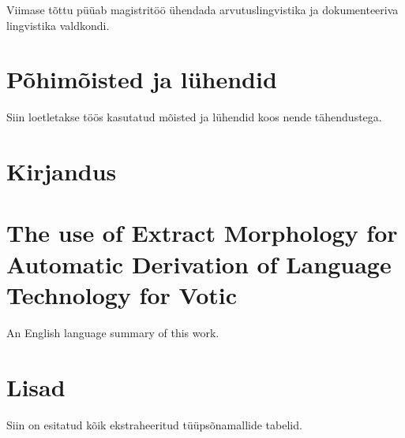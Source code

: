 \documentclass[12pt,a4paper]{article}
\begin{document}
Viimase tõttu püüab magistritöö ühendada arvutuslingvistika ja dokumenteeriva lingvistika valdkondi.







\newpage
\section{Põhimõisted ja lühendid}
\label{sec:põhimõisted}
Siin loetletakse töös kasutatud mõisted ja lühendid koos nende tähendustega.

\glsaddall
\small{
  \printglossary[title={},toctitle={}]
}








\newpage
\section{Kirjandus}
\label{sec:kirjandus}
{
  \renewcommand*{\bibfont}{\small}
  \printbibliography[heading=none]
}







\newpage
\section{The use of Extract Morphology for Automatic Derivation of Language Technology for Votic}

An English language summary of this work.







\newpage
\section{Lisad}

Siin on esitatud kõik ekstraheeritud tüüpsõnamallide tabelid.

%
\end{document}
